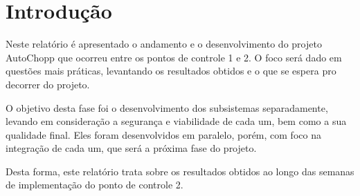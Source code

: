 \chapter[Introdução]{Introdução}

    Neste relatório é apresentado o andamento e o desenvolvimento do projeto AutoChopp que
    ocorreu entre os pontos de controle 1 e 2. O foco será dado em questões mais práticas,
    levantando os resultados obtidos e o que se espera pro decorrer do projeto.

    O objetivo desta fase foi o desenvolvimento dos subsistemas separadamente, levando em
    consideração a segurança e viabilidade de cada um, bem como a sua qualidade final.
    Eles foram desenvolvidos em  paralelo, porém, com foco na integração de cada um, 
    que será a próxima fase do projeto.
    
    Desta forma, este relatório trata sobre os resultados obtidos ao longo das semanas de 
    implementação do ponto de controle 2.

